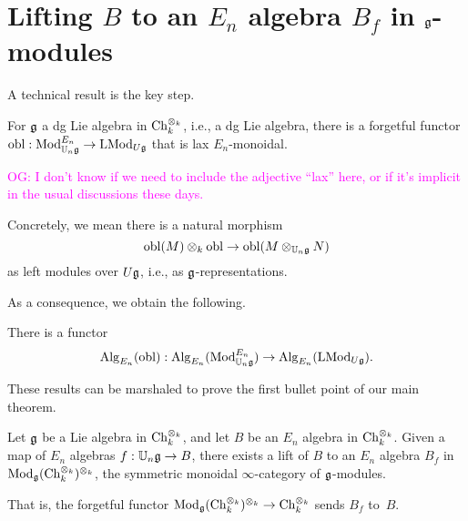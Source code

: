 \documentclass[11pt]{amsart}
\numberwithin{equation}{section}
\def\owen{\textcolor{magenta}{OG: }\textcolor{magenta}}
\begin{document}

\section{Lifting $B$ to an $E_n$ algebra $B_f$ in $\mathfrak g$-modules}

A technical result is the key step.

\def\obl{{\rm obl}}

\begin{prp}
\label{prp: def of obl}
For $\mathfrak g$ a dg Lie algebra in ${\rm Ch}_k^{\otimes_k}$, i.e., a dg Lie algebra, 
there is a forgetful functor $\obl: \Mod^{E_n}_{\UU_n \fg} \to \LMod_{U\fg}$ that is lax $E_n$-monoidal.
\end{prp}

\owen{I don't know if we need to include the adjective ``lax'' here, or if it's implicit in the usual discussions these days.}

Concretely, we mean there is a natural morphism
\[
\obl(M) \otimes_k \obl \to \obl(M \otimes_{\UU_n \fg} N) 
\]
as left modules over $U\mathfrak g$, i.e., as $\mathfrak g$-representations.

As a consequence, we obtain the following.

\begin{cor}
There is a functor 
\[
\Alg_{E_n}(\obl): \Alg_{E_n}({\Mod^{E_n}_{\UU_n \fg}}) \to \Alg_{E_n}(\LMod_{U\fg}).
\]
\end{cor}

These results can be marshaled to prove the first bullet point of our main theorem.

\begin{prp}
Let $\mathfrak g$ be a Lie algebra in ${\rm Ch}_k^{\otimes_k}$, 
and let $B$ be an $E_n$ algebra in ${\rm Ch}_k^{\otimes_k}$.
Given a map of $E_n$ algebras $f: \mathbb U_n \mathfrak g \to B$, 
there exists a lift of $B$ to an $E_n$ algebra $B_f$ in ${\rm Mod}_\mathfrak g({\rm Ch}_k^{\otimes_k})^{\otimes_k}$, the symmetric monoidal $\infty$-category of $\mathfrak g$-modules.
\end{prp}

That is, the forgetful functor ${\rm Mod}_\mathfrak g({\rm Ch}_k^{\otimes_k})^{\otimes_k} \to {\rm Ch}_k^{\otimes_k}$ sends $B_f$ to~$B$.
\end{document}
